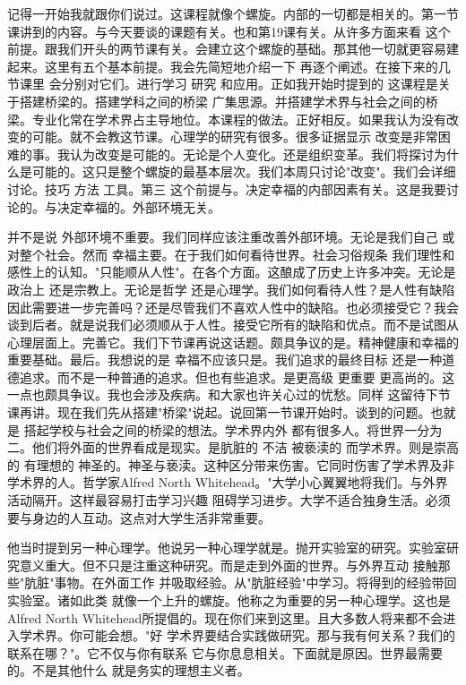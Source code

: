记得一开始我就跟你们说过。这课程就像个螺旋。内部的一切都是相关的。第一节课讲到的内容。与今天要谈的课题有关。也和第19课有关。从许多方面来看 这个前提。跟我们开头的两节课有关。会建立这个螺旋的基础。那其他一切就更容易建起来。这里有五个基本前提。我会先简短地介绍一下 再逐个阐述。在接下来的几节课里 会分别对它们。进行学习 研究 和应用。正如我开始时提到的 这课程是关于搭建桥梁的。搭建学科之间的桥梁 广集思源。并搭建学术界与社会之间的桥梁。专业化常在学术界占主导地位。本课程的做法。正好相反。如果我认为没有改变的可能。就不会教这节课。心理学的研究有很多。很多证据显示 改变是非常困难的事。我认为改变是可能的。无论是个人变化。还是组织变革。我们将探讨为什么是可能的。这只是整个螺旋的最基本层次。我们本周只讨论"改变"。我们会详细讨论。技巧 方法 工具。第三 这个前提与。决定幸福的内部因素有关。这是我要讨论的。与决定幸福的。外部环境无关。 

并不是说 外部环境不重要。我们同样应该注重改善外部环境。无论是我们自己 或对整个社会。然而 幸福主要。在于我们如何看待世界。社会习俗规条 我们理性和感性上的认知。"只能顺从人性"。在各个方面。这酿成了历史上许多冲突。无论是政治上 还是宗教上。无论是哲学 还是心理学。我们如何看待人性？是人性有缺陷 因此需要进一步完善吗？还是尽管我们不喜欢人性中的缺陷。也必须接受它？我会谈到后者。就是说我们必须顺从于人性。接受它所有的缺陷和优点。而不是试图从心理层面上。完善它。我们下节课再说这话题。颇具争议的是。精神健康和幸福的重要基础。最后。我想说的是 幸福不应该只是。我们追求的最终目标 还是一种道德追求。而不是一种普通的追求。但也有些追求。是更高级 更重要 更高尚的。这一点也颇具争议。我也会涉及疾病。和大家也许关心过的忧愁。同样 这留待下节课再讲。现在我们先从搭建"桥梁"说起。说回第一节课开始时。谈到的问题。也就是 搭起学校与社会之间的桥梁的想法。学术界内外 都有很多人。将世界一分为二。他们将外面的世界看成是现实。是肮脏的 不洁 被亵渎的 而学术界。则是崇高的 有理想的 神圣的。神圣与亵渎。这种区分带来伤害。它同时伤害了学术界及非学术界的人。哲学家Alfred North Whitehead。"大学小心翼翼地将我们。与外界活动隔开。这样最容易打击学习兴趣 阻碍学习进步。大学不适合独身生活。必须要与身边的人互动。这点对大学生活非常重要。 

他当时提到另一种心理学。他说另一种心理学就是。抛开实验室的研究。实验室研究意义重大。但不只是注重这种研究。而是走到外面的世界。与外界互动 接触那些"肮脏"事物。在外面工作 并吸取经验。从"肮脏经验"中学习。将得到的经验带回实验室。诸如此类 就像一个上升的螺旋。他称之为重要的另一种心理学。这也是Alfred North Whitehead所提倡的。现在你们来到这里。且大多数人将来都不会进入学术界。你可能会想。"好 学术界要结合实践做研究。那与我有何关系？我们的联系在哪？"。它不仅与你有联系 它与你息息相关。下面就是原因。世界最需要的。不是其他什么 就是务实的理想主义者。 

